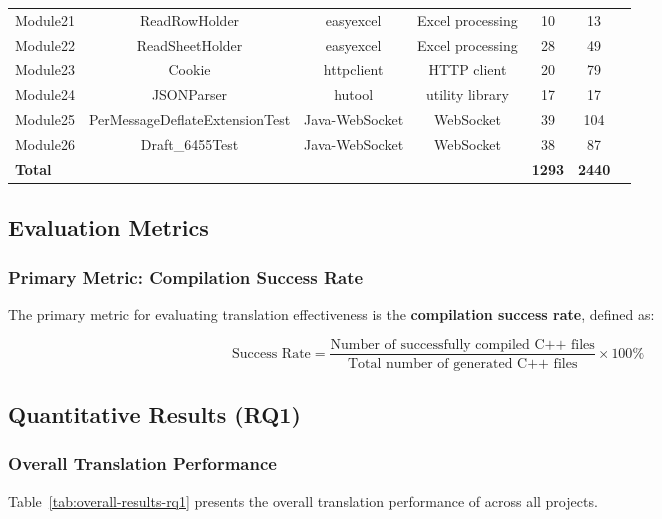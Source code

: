 \begin{table}[h]
\begin{tabular}{lcccccc}
\midrule
Module21 & ReadRowHolder & easyexcel & Excel processing & 10 & 13 \\
Module22 & ReadSheetHolder & easyexcel & Excel processing & 28 & 49 \\
\midrule
Module23 & Cookie & httpclient & HTTP client & 20 & 79 \\
\midrule
Module24 & JSONParser & hutool & utility library & 17 & 17 \\
\midrule
Module25 & PerMessageDeflateExtensionTest & Java-WebSocket & WebSocket & 39 & 104 \\
Module26 & Draft\_6455Test & Java-WebSocket & WebSocket & 38 & 87 \\
\midrule
\textbf{Total} & & & & \textbf{1293} & \textbf{2440} \\
\bottomrule
\end{tabular}
\end{table}

\subsection{Evaluation Metrics}

\subsubsection{Primary Metric: Compilation Success Rate}

The primary metric for evaluating translation effectiveness is the \textbf{compilation success rate}, defined as:

\begin{equation}
\text{Success Rate} = \frac{\text{Number of successfully compiled C++ files}}{\text{Total number of generated C++ files}} \times 100\%
\end{equation}

\subsection{Quantitative Results (RQ1)}

\subsubsection{Overall Translation Performance}

Table~\ref{tab:overall-results-rq1} presents the overall translation performance of \tool{} across all projects.

